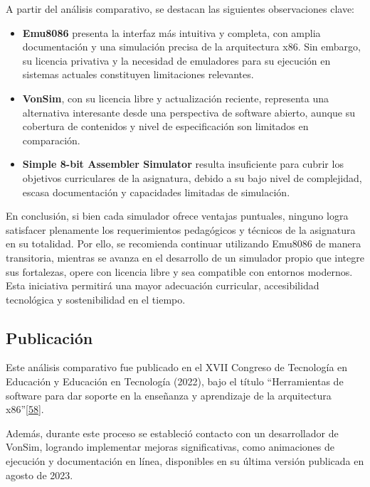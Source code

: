 \documentclass[12pt,oneside]{templates/unerthesis}
\providecommand{\tightlist}{%
  \setlength{\itemsep}{0pt}\setlength{\parskip}{0pt}}
\begin{document}
A partir del análisis comparativo, se destacan las siguientes observaciones clave:

\begin{itemize}
\tightlist
\item
  \textbf{Emu8086} presenta la interfaz más intuitiva y completa, con amplia documentación y una simulación precisa de la arquitectura x86. Sin embargo, su licencia privativa y la necesidad de emuladores para su ejecución en sistemas actuales constituyen limitaciones relevantes.
\item
  \textbf{VonSim}, con su licencia libre y actualización reciente, representa una alternativa interesante desde una perspectiva de software abierto, aunque su cobertura de contenidos y nivel de especificación son limitados en comparación.
\item
  \textbf{Simple 8-bit Assembler Simulator} resulta insuficiente para cubrir los objetivos curriculares de la asignatura, debido a su bajo nivel de complejidad, escasa documentación y capacidades limitadas de simulación.
\end{itemize}

En conclusión, si bien cada simulador ofrece ventajas puntuales, ninguno logra satisfacer plenamente los requerimientos pedagógicos y técnicos de la asignatura en su totalidad. Por ello, se recomienda continuar utilizando Emu8086 de manera transitoria, mientras se avanza en el desarrollo de un simulador propio que integre sus fortalezas, opere con licencia libre y sea compatible con entornos modernos. Esta iniciativa permitirá una mayor adecuación curricular, accesibilidad tecnológica y sostenibilidad en el tiempo.

\hypertarget{publicaciuxf3n}{%
\subsection{Publicación}\label{publicaciuxf3n}}

Este análisis comparativo fue publicado en el XVII Congreso de Tecnología en Educación y Educación en Tecnología (2022), bajo el título ``Herramientas de software para dar soporte en la enseñanza y aprendizaje de la arquitectura x86''\protect\hyperlink{ref-colombani_herramientas_2022}{{[}58{]}}.

Además, durante este proceso se estableció contacto con un desarrollador de VonSim, logrando implementar mejoras significativas, como animaciones de ejecución y documentación en línea, disponibles en su última versión publicada en agosto de 2023.
\end{document}
